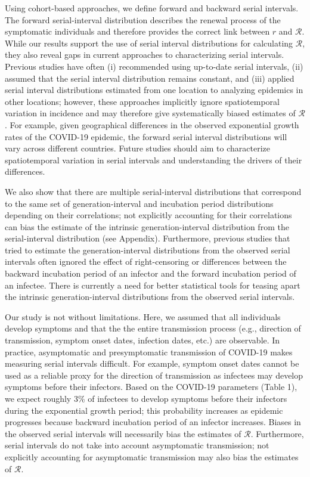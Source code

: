\documentclass[12pt]{article}
\begin{document}
Using cohort-based approaches, we define forward and backward serial intervals.
The forward serial-interval distribution describes the renewal process of the symptomatic individuals and therefore provides the correct link between $r$ and $\mathcal R$.
While our results support the use of serial interval distributions for calculating $\mathcal R$, 
they also reveal gaps in current approaches to characterizing serial intervals.
Previous studies have often (i) recommended using up-to-date serial intervals, (ii) assumed that the serial interval distribution remains constant, and (iii) applied serial interval distributions estimated from one location to analyzing epidemics in other locations;
however, these approaches implicitly ignore spatiotemporal variation in incidence and may therefore give systematically biased estimates of $\mathcal R$. 
For example, given geographical differences in the observed exponential growth rates of the COVID-19 epidemic, the forward serial interval distributions will vary across different countries.
Future studies should aim to characterize spatiotemporal variation in serial intervals and understanding the drivers of their differences.

We also show that there are multiple serial-interval distributions that correspond to the same set of generation-interval and incubation period distributions depending on their correlations;
not explicitly accounting for their correlations can bias the estimate of the intrinsic generation-interval distribution from the serial-interval distribution (see Appendix).
Furthermore, previous studies that tried to estimate the generation-interval distributions from the observed serial intervals often ignored the effect of right-censoring or differences between the backward incubation period of an infector and the forward incubation period of an infectee.
There is currently a need for better statistical tools for teasing apart the intrinsic generation-interval distributions from the observed serial intervals.

Our study is not without limitations.
Here, we assumed that all individuals develop symptoms and that the the entire transmission process (e.g., direction of transmission, symptom onset dates, infection dates, etc.) are observable.
In practice, asymptomatic and presymptomatic transmission of COVID-19 makes measuring serial intervals difficult.
For example, symptom onset dates cannot be used as a reliable proxy for the direction of transmission as infectees may develop symptoms before their infectors.
Based on the COVID-19 parameters (Table 1), we expect roughly 3\% of infectees to develop symptoms before their infectors during the exponential growth period; 
this probability increases as epidemic progresses because backward incubation period of an infector increases.
Biases in the observed serial intervals will necessarily bias the estimates of $\mathcal R$.
Furthermore, serial intervals do not take into account asymptomatic transmission; 
not explicitly accounting for asymptomatic transmission may also  bias the estimates of $\mathcal R$.
\end{document}

